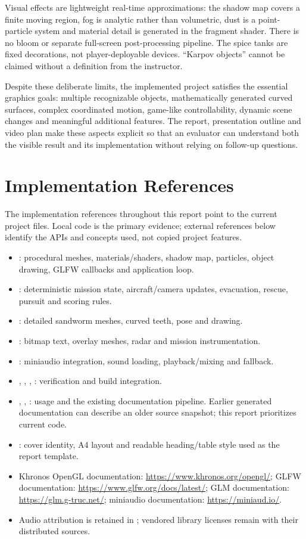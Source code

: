 Visual effects are lightweight real-time approximations: the shadow map covers a finite moving region, fog is analytic rather than volumetric, dust is a point-particle system and material detail is generated in the fragment shader. There is no bloom or separate full-screen post-processing pipeline. The spice tanks are fixed decorations, not player-deployable devices. ``Karpov objects'' cannot be claimed without a definition from the instructor.

Despite these deliberate limits, the implemented project satisfies the essential graphics goals: multiple recognizable objects, mathematically generated curved surfaces, complex coordinated motion, game-like controllability, dynamic scene changes and meaningful additional features. The report, presentation outline and video plan make these aspects explicit so that an evaluator can understand both the visible result and its implementation without relying on follow-up questions.

\section{Implementation References}
The implementation references throughout this report point to the current project files. Local code is the primary evidence; external references below identify the APIs and concepts used, not copied project features.
\begin{itemize}
\item {}: procedural meshes, materials/shaders, shadow map, particles, object drawing, GLFW callbacks and application loop.
\item {}: deterministic mission state, aircraft/camera updates, evacuation, rescue, pursuit and scoring rules.
\item {}: detailed sandworm meshes, curved teeth, pose and drawing.
\item {}: bitmap text, overlay meshes, radar and mission instrumentation.
\item {}: miniaudio integration, sound loading, playback/mixing and fallback.
\item {}, , , : verification and build integration.
\item {}, , : usage and the existing documentation pipeline. Earlier generated documentation can describe an older source snapshot; this report prioritizes current code.
\item {}: cover identity, A4 layout and readable heading/table style used as the report template.
\item Khronos OpenGL documentation: \url{https://www.khronos.org/opengl/}; GLFW documentation: \url{https://www.glfw.org/docs/latest/}; GLM documentation: \url{https://glm.g-truc.net/}; miniaudio documentation: \url{https://miniaud.io/}.
\item Audio attribution is retained in ; vendored library licenses remain with their distributed sources.
\end{itemize}
